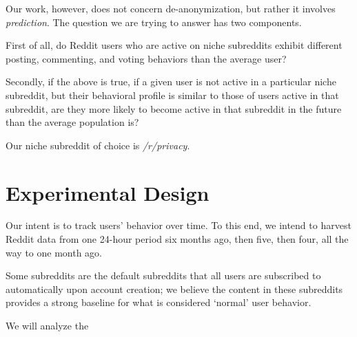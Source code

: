 \documentclass[10pt]{article}
\begin{document}
Our work, however, does not concern de-anonymization, but rather it involves \textit{prediction}. The question we are trying to answer has two components.

First of all, do Reddit users who are active on niche subreddits exhibit different posting, commenting, and voting behaviors than the average user?

Secondly, if the above is true, if a given user is not active in a particular niche subreddit, but their behavioral profile is similar to those of users active in that subreddit, are they more likely to become active in that subreddit in the future than the average population is?

Our niche subreddit of choice is \textit{/r/privacy}.

\section{Experimental Design}

Our intent is to track users' behavior over time. To this end, we intend to harvest Reddit data from one 24-hour period six months ago, then five, then four, all the way to one month ago.

Some subreddits are the default subreddits that all users are subscribed to automatically upon account creation; we believe the content in these subreddits provides a strong baseline for what is considered `normal' user behavior.

We will analyze the 



\end{document}
